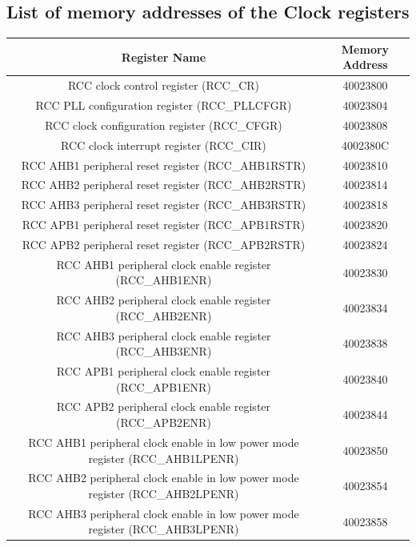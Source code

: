 \documentclass[footheight=20pt, footsepline, headheight=20pt, headsepline]{scrartcl}
\begin{document}
\subsection*{List of memory addresses of the Clock registers}
\vspace{0.5cm}
\begin{tabular}{ |c|c| }
    \hline
    \textbf{Register Name} & \textbf{Memory Address}  \\
    \hline
    RCC clock control register (RCC\_CR) & 40023800\\
    \hline
    RCC PLL configuration register (RCC\_PLLCFGR) & 40023804\\
    \hline
    RCC clock configuration register (RCC\_CFGR) & 40023808\\
    \hline
    RCC clock interrupt register (RCC\_CIR) & 4002380C\\
    \hline
    RCC AHB1 peripheral reset register (RCC\_AHB1RSTR) & 40023810\\
    \hline
    RCC AHB2 peripheral reset register (RCC\_AHB2RSTR) & 40023814\\
    \hline
    RCC AHB3 peripheral reset register (RCC\_AHB3RSTR) & 40023818\\
    \hline
    RCC APB1 peripheral reset register (RCC\_APB1RSTR) & 40023820\\
    \hline
    RCC APB2 peripheral reset register (RCC\_APB2RSTR) & 40023824\\
    \hline
    RCC AHB1 peripheral clock enable register (RCC\_AHB1ENR)  & 40023830\\
    \hline
    RCC AHB2 peripheral clock enable register (RCC\_AHB2ENR) & 40023834\\
    \hline
    RCC AHB3 peripheral clock enable register (RCC\_AHB3ENR) & 40023838\\
    \hline
    RCC APB1 peripheral clock enable register (RCC\_APB1ENR) & 40023840\\
    \hline
    RCC APB2 peripheral clock enable register (RCC\_APB2ENR) & 40023844\\
    \hline
    RCC AHB1 peripheral clock enable in low power mode register (RCC\_AHB1LPENR) & 40023850\\
    \hline
    RCC AHB2 peripheral clock enable in low power mode register (RCC\_AHB2LPENR) & 40023854\\
    \hline
    RCC AHB3 peripheral clock enable in low power mode register (RCC\_AHB3LPENR) & 40023858\\

\end{tabular}
\end{document}
